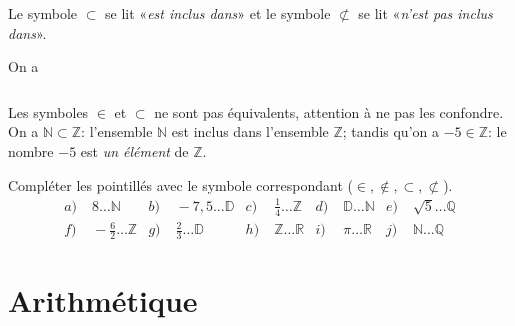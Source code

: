 \documentclass[11pt]{article}
\begin{document}
\begin{notation}
  Le symbole $\subset$ se lit «\emph{est inclus dans}» et le symbole
  $\not\subset$ se lit «\emph{n'est pas inclus dans}».
\end{notation}
\begin{propadm}
  On a 
  \[
    \phantom{\mathbb{N}\subset\mathbb{Z}\subset\mathbb{D}\subset\mathbb{Q}\subset\mathbb{R}.}
  \]
\end{propadm}
\vspace{7cm}
\begin{rmq}
  Les symboles $\in$ et $\subset$ ne sont pas équivalents, attention à ne pas
  les confondre. On a $\mathbb{N}\subset \mathbb{Z}$: l'ensemble $\mathbb{N}$
  est inclus dans l'ensemble $\mathbb{Z}$; tandis qu'on a $-5\in\mathbb{Z}$: le
  nombre $-5$ est \emph{un élément} de $\mathbb{Z}$.
\end{rmq}

\begin{exemple}
  Compléter les pointillés avec le symbole correspondant ($\in, \notin,
  \subset, \not\subset$).
\begin{align*}
  a)&\; 8 \ldots \mathbb{N} &
  b)&\; -7,5 \ldots \mathbb{D} &
  c)&\; \frac{1}{4} \ldots \mathbb{Z} &
  d)&\; \mathbb{D} \ldots \mathbb{N} &
  e)&\; \sqrt 5 \ldots \mathbb{Q} \\
  f)&\; -\frac{6}{2} \ldots \mathbb{Z} &
  g)&\; \frac{2}{3} \ldots \mathbb{D} &
  h)&\; \mathbb{Z} \ldots \mathbb{R} &
  i)&\; \pi \ldots \mathbb{R} &
  j)&\; \mathbb{N} \ldots \mathbb{Q}
\end{align*}
\end{exemple}

\newpage
\section{Arithmétique}
\end{document}
